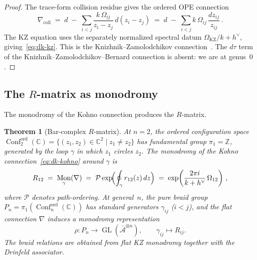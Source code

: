 \documentclass[11pt,reqno]{amsart}
\newtheorem{theorem}{Theorem}[section]
\theoremstyle{definition}
\theoremstyle{remark}
\newcommand{\cA}{\mathcal{A}}
\newcommand{\cP}{\mathcal{P}}
\DeclareMathOperator{\Conf}{Conf}
\DeclareMathOperator{\Mon}{Mon}
\DeclareMathOperator{\GL}{GL}
\newcommand{\CC}{\mathbb{C}}
\newcommand{\ZZ}{\mathbb{Z}}
\newcommand{\kp}{k + h^{\vee}}
\numberwithin{equation}{section}
\begin{document}
\begin{proof}
The trace-form collision residue gives the ordered OPE connection
\[
\nabla_{\mathrm{coll}}
\;=\;
d
\;-\;
\sum_{i < j}
\frac{k\,\Omega_{ij}}{z_i - z_j}\,d(z_i - z_j)
\;=\;
d
\;-\;
\sum_{i < j}
k\,\Omega_{ij}\,
\frac{dz_{ij}}{z_{ij}}\,.
\]
The KZ equation uses the separately normalized spectral datum
\(\Omega_{\mathrm{KZ}}/\kp\), giving~\eqref{eq:dk-kz}.  This is the
Knizhnik--Zamolodchikov connection~\cite{KZ84}.  The $d\tau$ term of the
Knizhnik--Zamolodchikov--Bernard connection is absent: we
are at genus~$0$.
\end{proof}

\subsection{The $R$-matrix as monodromy}

The monodromy of the Kohno connection produces the
$R$-matrix.

\begin{theorem}[Bar-complex $R$-matrix]
\label{thm:dk-r-matrix}
At $n = 2$, the ordered configuration space
$\Conf_2^{\mathrm{ord}}(\CC) = \{(z_1, z_2) \in \CC^2
\mid z_1 \neq z_2\}$ has fundamental group
$\pi_1 = \ZZ$, generated by the loop $\gamma$ in which
$z_1$ circles $z_2$.  The monodromy of the Kohno
connection~\eqref{eq:dk-kohno} around $\gamma$ is
\begin{equation}\label{eq:dk-r-monodromy}
R_{12}
\;=\;
\Mon_\gamma(\nabla)
\;=\;
\cP\exp\!\Bigl(
\oint_\gamma r_{12}(z)\,dz
\Bigr)
\;=\;
\exp\!\left(\frac{2\pi i}{\kp}\,\Omega_{12}\right)\,,
\end{equation}
where $\cP$ denotes path-ordering.
At general~$n$, the pure braid group
$P_n = \pi_1(\Conf_n^{\mathrm{ord}}(\CC))$ has standard
generators $\gamma_{ij}$ ($i < j$), and the flat connection
$\nabla$ induces a monodromy representation
\[
\rho \colon P_n \to \GL(\bar{\cA}^{\otimes n}),
\qquad
\gamma_{ij} \mapsto R_{ij}.
\]
The braid relations are obtained from flat KZ monodromy together with
the Drinfeld associator.
\end{theorem}
\end{document}
